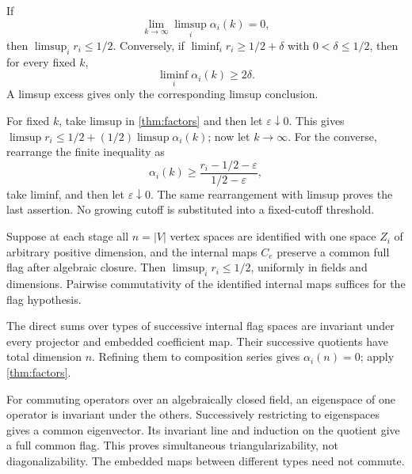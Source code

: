 \begin{corollary}\label{cor:factor-excess}
\notformalized
If
\[
 \lim_{k\to\infty}\limsup_i\alpha_i(k)=0,
\]
then $\limsup_i r_i\le1/2$. Conversely, if
$\liminf_i r_i\ge1/2+\delta$ with $0<\delta\le1/2$, then for
every fixed $k$,
\[
 \liminf_i\alpha_i(k)\ge2\delta.
\]
A limsup excess gives only the corresponding limsup conclusion.
\end{corollary}
\begin{informalproof}
For fixed $k$, take limsup in \cref{thm:factors} and then let
$\varepsilon\downarrow0$. This gives
$\limsup r_i\le1/2+(1/2)\limsup\alpha_i(k)$; now let $k\to\infty$.
For the converse, rearrange the finite inequality as
\[
 \alpha_i(k)\ge\frac{r_i-1/2-\varepsilon}{1/2-\varepsilon},
\]
take liminf, and then let $\varepsilon\downarrow0$.
The same rearrangement with limsup proves the last assertion.
No growing cutoff is substituted into a fixed-cutoff threshold.
\end{informalproof}

\begin{corollary}\label{cor:flag-half}
\notformalized
Suppose at each stage all $n=|V|$ vertex spaces are identified with
one space $Z_i$ of arbitrary positive dimension, and the internal
maps $C_e$ preserve a common full flag after algebraic closure.
Then $\limsup_i r_i\le1/2$, uniformly in fields and dimensions.
Pairwise commutativity of the identified internal maps suffices for
the flag hypothesis.
\end{corollary}
\begin{informalproof}
The direct sums over types of successive internal flag spaces are
invariant under every projector and embedded coefficient map.
Their successive quotients have total dimension $n$. Refining them
to composition series gives $\alpha_i(n)=0$; apply \cref{thm:factors}.

For commuting operators over an algebraically closed field, an
eigenspace of one operator is invariant under the others. Successively
restricting to eigenspaces gives a common eigenvector. Its invariant
line and induction on the quotient give a full common flag.
This proves simultaneous triangularizability, not diagonalizability.
The embedded maps between different types need not commute.
\end{informalproof}

